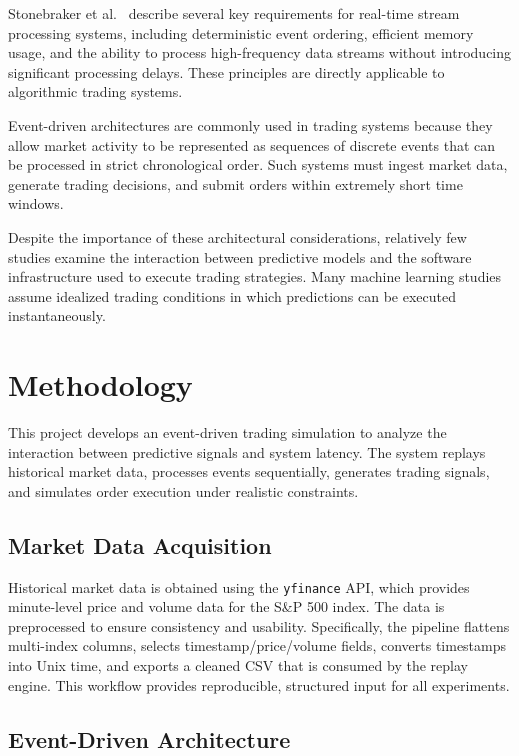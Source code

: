 \documentclass[12pt]{article}
\begin{document}
Stonebraker et al.~\cite{stonebrakerLatency} describe several key 
requirements for real-time stream processing systems, including 
deterministic event ordering, efficient memory usage, and the ability 
to process high-frequency data streams without introducing significant 
processing delays. These principles are directly applicable to 
algorithmic trading systems.

Event-driven architectures are commonly used in trading systems because 
they allow market activity to be represented as sequences of discrete 
events that can be processed in strict chronological order. Such systems 
must ingest market data, generate trading decisions, and submit orders 
within extremely short time windows.

Despite the importance of these architectural considerations, relatively 
few studies examine the interaction between predictive models and the 
software infrastructure used to execute trading strategies. Many machine 
learning studies assume idealized trading conditions in which predictions 
can be executed instantaneously.

\section{Methodology}

This project develops an event-driven trading simulation to analyze the 
interaction between predictive signals and system latency. The system 
replays historical market data, processes events sequentially, generates 
trading signals, and simulates order execution under realistic constraints.

\subsection{Market Data Acquisition}

Historical market data is obtained using the \texttt{yfinance} API, which 
provides minute-level price and volume data for the S\&P 500 index. The 
data is preprocessed to ensure consistency and usability. Specifically, the
pipeline flattens multi-index columns, selects timestamp/price/volume fields,
converts timestamps into Unix time, and exports a cleaned CSV that is consumed
by the replay engine. This workflow provides reproducible, structured input for
all experiments.

\subsection{Event-Driven Architecture}
\end{document}
